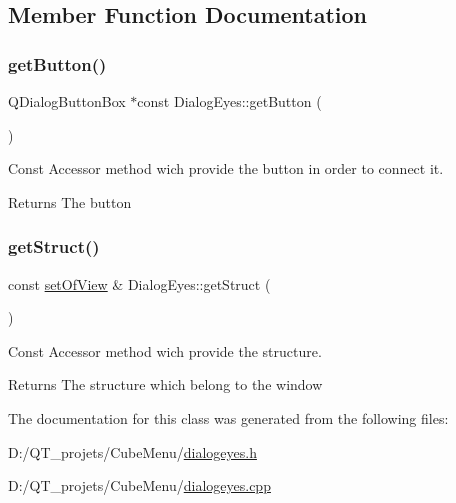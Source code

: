 \subsection{Member Function Documentation}
\hypertarget{class_dialog_eyes_a29267293c5a4b873aa59c7baafd65227}{}\label{class_dialog_eyes_a29267293c5a4b873aa59c7baafd65227} 
\subsubsection{\texorpdfstring{get\+Button()}{getButton()}}
{\footnotesize\ttfamily Q\+Dialog\+Button\+Box $\ast$const Dialog\+Eyes\+::get\+Button (\begin{DoxyParamCaption}{ }\end{DoxyParamCaption})}



Const Accessor method wich provide the button in order to connect it. 

\begin{DoxyReturn}{Returns}
The button 
\end{DoxyReturn}
\hypertarget{class_dialog_eyes_a71df236a91eafd03c9747ec3d245d017}{}\label{class_dialog_eyes_a71df236a91eafd03c9747ec3d245d017} 
\subsubsection{\texorpdfstring{get\+Struct()}{getStruct()}}
{\footnotesize\ttfamily const \hyperlink{structset_of_view}{set\+Of\+View} \& Dialog\+Eyes\+::get\+Struct (\begin{DoxyParamCaption}{ }\end{DoxyParamCaption})}



Const Accessor method wich provide the structure. 

\begin{DoxyReturn}{Returns}
The structure which belong to the window 
\end{DoxyReturn}


The documentation for this class was generated from the following files\+:\begin{DoxyCompactItemize}
\item 
D\+:/\+Q\+T\+\_\+projets/\+Cube\+Menu/\hyperlink{dialogeyes_8h}{dialogeyes.\+h}\item 
D\+:/\+Q\+T\+\_\+projets/\+Cube\+Menu/\hyperlink{dialogeyes_8cpp}{dialogeyes.\+cpp}\end{DoxyCompactItemize}
